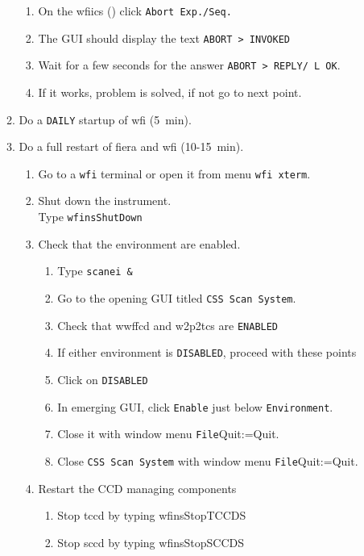 \documentclass[11pt,fleqn,a4paper]{book}
\makeatletter
\def\menu#1#2{\texttt{#1}\ifx{}#2\else\@for\@x:=#2\do{$\rightarrow$\texttt{\@x}}\fi}
\def\wmenu#1#2{window menu \menu{#1}{#2}}
\makeatother
\begin{document}
\begin{enumerate}
\begin{enumerate}
\begin{enumerate}
           \item On the \gls{wfiics} () click \texttt{Abort Exp./Seq.}
           \item The GUI should display the text \texttt{ABORT    > INVOKED}
           \item Wait for a few seconds for the answer \texttt{ABORT    > REPLY/ L   OK}.
           \item If it works, problem is solved, if not go to next point.
        \end{enumerate}
      \item Do a \texttt{DAILY} startup of \gls{wfi} (5~min).
      \item\label{list:wfifierarestart} Do a full restart of \gls{fiera} and \gls{wfi} (10-15~min).
        \begin{enumerate}
          \item Go to a \texttt{wfi} terminal or open it from menu \texttt{wfi xterm}.
          \item Shut down the instrument.\\
                Type \texttt{wfinsShutDown}
          \item Check that the environment are enabled.
             \begin{enumerate}
               \item Type \texttt{scanei \&} 
               \item Go to the opening GUI titled \texttt{CSS Scan System}.
               \item Check that \gls{wwffcd} and \gls{w2p2tcs} are \texttt{ENABLED}
               \item If either environment is \texttt{DISABLED}, proceed with these points
               \item Click on \texttt{DISABLED}
               \item In emerging GUI, click \texttt{Enable} just below \texttt{Environment}.
               \item Close it with \wmenu{File}{Quit}.
               \item Close \texttt{CSS Scan System} with \wmenu{File}{Quit}.
            \end{enumerate} 
          \item Restart the CCD managing components
             \begin{enumerate} 
               \item Stop \acrlong{tccd} by typing \gls{wfinsStopTCCDS}
               \item Stop \acrlong{sccd} by typing \gls{wfinsStopSCCDS}

\end{enumerate}
\end{enumerate}
\end{enumerate}
\end{enumerate}
\end{document}
